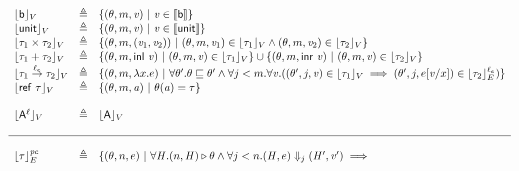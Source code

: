 \begin{figure*}[!htbp]
\begin{displaymath}
  \begin{array}{lll}
    \lfloor \mathsf{b} \rfloor_{V} & \triangleq & \{(\theta, m, \mathit{v}) ~|~ \mathit{v} \in \llbracket \mathsf{b} \rrbracket \} \\

    \lfloor \mathsf{unit} \rfloor_{V} & \triangleq & \{(\theta, m,  \mathit{v}) ~|~ \mathit{v} \in \llbracket \mathsf{unit} \rrbracket \} \\

    \lfloor \tau_1 \times \tau_2 \rfloor_{V} & \triangleq & \{(\theta, m, (\mathit{v}_1, \mathit{v}_2)) ~|~
                                       (\theta, m, \mathit{v}_1) \in \lfloor \tau_1 \rfloor_{V} \wedge
                                       (\theta, m, \mathit{v}_2) \in \lfloor \tau_2 \rfloor_{V}
                                       \}\\

    \lfloor \tau_1 + \tau_2 \rfloor_{V} & \triangleq & \{(\theta, m, \mathsf{inl} ~  \mathit{v}) ~|~
                                           (\theta, m, \mathit{v}) \in \lfloor \tau_1 \rfloor_{V} \} \cup
                                           \{(\theta, m, \mathsf{inr} ~  \mathit{v}) ~|~
                                           (\theta, m, \mathit{v}) \in \lfloor \tau_2 \rfloor_{V} \} \\

    \lfloor \tau_1 \overset{\ell_e}\to \tau_2 \rfloor_{V} & \triangleq & \{(\theta, m, \lambda x. e) ~|~
                                              \forall \theta'. \theta \sqsubseteq \theta' \wedge \forall j < m.
                                              \forall \mathit{v}. ((\theta', j, \mathit{v}) \in \lfloor \tau_1 \rfloor_{V} \implies
                          (\theta', j, e[\mathit{v}/x]) \in \lfloor \tau_2 \rfloor_{E}^{\ell_e}) \} \\

    \lfloor \mathsf{ref} ~ \tau \rfloor_{V} & \triangleq & \{(\theta, m, \mathit{a}) ~|~  \theta (\mathit{a}) = \tau
                                        \} \\ \\
    \lfloor \mathsf{A}^{\ell} \rfloor_{V} & \triangleq & \lfloor \mathsf{A} \rfloor_{V}
    \\ \\
\hline \\
    \lfloor \tau \rfloor_{E}^{\mathit{pc}} & \triangleq & \{(\theta, n, e) ~|~
                                \forall \mathit{H}. (n, \mathit{H}) \overset{}\triangleright \theta \wedge
                                \forall j < n. (\mathit{H}, e) \Downarrow_{j} (\mathit{H}', \mathit{v}') \implies \\


\end{array}
\end{displaymath}
\end{figure*}
